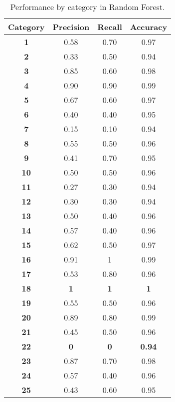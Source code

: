 \documentclass[10pt,twocolumn,letterpaper]{article}
\begin{document}
\begin{table}[h!]
\centering
\caption{Performance by category in Random Forest.}
\label{RF}
\begin{tabular}{|c|c|c|c|}
\hline
\multicolumn{1}{|l|}{\textbf{Category}} & \multicolumn{1}{l|}{\textbf{Precision}} & \multicolumn{1}{l|}{\textbf{Recall}} & \multicolumn{1}{l|}{\textbf{Accuracy}} \\ \hline
\textbf{1} & 0.58 & 0.70 & 0.97 \\ \hline
\textbf{2} & 0.33 & 0.50 & 0.94 \\ \hline
\textbf{3} & 0.85 & 0.60 & 0.98 \\ \hline
\textbf{4} & 0.90 & 0.90 & 0.99 \\ \hline
\textbf{5} & 0.67 & 0.60 & 0.97 \\ \hline
\textbf{6} & 0.40 & 0.40 & 0.95 \\ \hline
\textbf{7} & 0.15 & 0.10 & 0.94 \\ \hline
\textbf{8} & 0.55 & 0.50 & 0.96 \\ \hline
\textbf{9} & 0.41 & 0.70 & 0.95 \\ \hline
\textbf{10} & 0.50 & 0.50 & 0.96 \\ \hline
\textbf{11} & 0.27 & 0.30 & 0.94 \\ \hline
\textbf{12} & 0.30 & 0.30 & 0.94 \\ \hline
\textbf{13} & 0.50 & 0.40 & 0.96 \\ \hline
\textbf{14} & 0.57 & 0.40 & 0.96 \\ \hline
\textbf{15} & 0.62 & 0.50 & 0.97 \\ \hline
\textbf{16} & 0.91 & 1 & 0.99 \\ \hline
\textbf{17} & 0.53 & 0.80 & 0.96 \\ \hline
\rowcolor[HTML]{32CB00} 
\textbf{18} & \textbf{1} & \textbf{1} & \textbf{1} \\ \hline
\textbf{19} & 0.55 & 0.50 & 0.96 \\ \hline
\textbf{20} & 0.89 & 0.80 & 0.99 \\ \hline
\textbf{21} & 0.45 & 0.50 & 0.96 \\ \hline
\rowcolor[HTML]{FD6864} 
{\color[HTML]{333333} \textbf{22}} & {\color[HTML]{333333} \textbf{0}} & {\color[HTML]{333333} \textbf{0}} & {\color[HTML]{333333} \textbf{0.94}} \\ \hline
\textbf{23} & 0.87 & 0.70 & 0.98 \\ \hline
\textbf{24} & 0.57 & 0.40 & 0.96 \\ \hline
\textbf{25} & 0.43 & 0.60 & 0.95 \\ \hline
\end{tabular}
\end{table}
\end{document}

